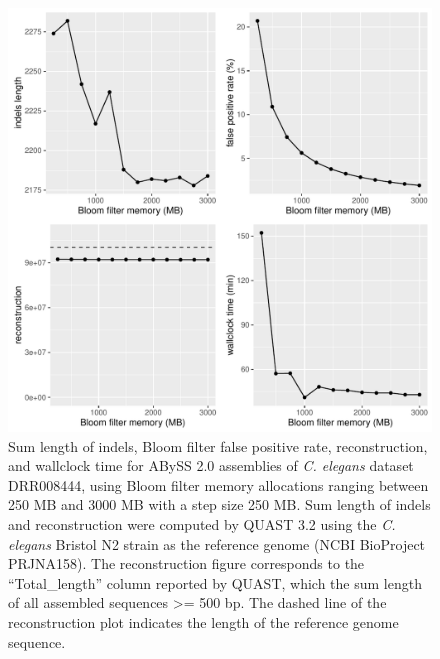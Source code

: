 \documentclass[
  12pt,
  oneside,
  openany]{book}
\begin{document}
\begin{appendices}
\begin{figure}
\hypertarget{fig:fpr3}{%
\centering
\includegraphics{abyss2-appendix/quast-c.pdf}
\caption[Sum length of indels, Bloom filter false positive rate, reconstruction, and wallclock time for ABySS 2.0 assemblies of \emph{C. elegans} dataset DRR008444, using Bloom filter memory allocations ranging between 250 MB and 3000 MB with a step size 250 MB.]{Sum length of indels, Bloom filter false positive rate, reconstruction, and wallclock time for ABySS 2.0 assemblies of \emph{C. elegans} dataset DRR008444, using Bloom filter memory allocations ranging between 250 MB and 3000 MB with a step size 250 MB. Sum length of indels and reconstruction were computed by QUAST 3.2 using the \emph{C. elegans} Bristol N2 strain as the reference genome (NCBI BioProject PRJNA158). The reconstruction figure corresponds to the ``Total\_length'' column reported by QUAST, which the sum length of all assembled sequences \textgreater= 500 bp. The dashed line of the reconstruction plot indicates the length of the reference genome sequence.}\label{fig:fpr3}
}
\end{figure}


\end{appendices}
\end{document}

